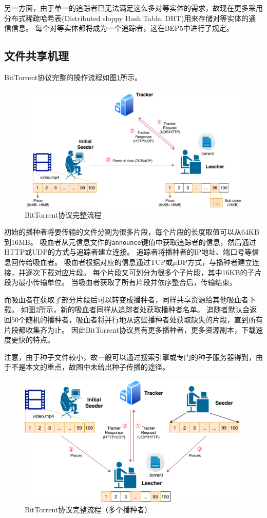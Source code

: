 \documentclass[thesis]{thesis}
\begin{document}
	另一方面，由于单一的追踪者已无法满足这么多对等实体的需求，故现在更多采用分布式稀疏哈希表(Distributed sloppy Hash Table, DHT)用来存储对等实体的通信信息。
	每个对等实体都将成为一个追踪者，这在BEP5\cite{bt_dht}中进行了规定。
	
	\subsection{文件共享机理}
	\label{sub:share}
	BitTorrent协议完整的操作流程如图\ref{fig:overview}所示。
	
	\begin{figure}[htbp]
		\centering
		\includegraphics[width=0.7\linewidth]{fig/BitTorrent-BitTorrent.pdf}
		\caption{BitTorrent协议完整流程}
		\label{fig:overview}
	\end{figure}
	
	初始的播种者将要传输的文件分割为很多片段，每个片段的长度取值可以从64KB到16MB。
	吸血者从元信息文件的\verb'announce'键值中获取追踪者的信息，然后通过HTTP或UDP的方式与追踪者建立连接。
	追踪者将播种者的IP地址、端口号等信息回传给吸血者。
	吸血者根据对应的信息通过TCP或$\mu$DP方式，与播种者建立连接，并逐次下载对应片段。
	每个片段又可划分为很多个子片段，其中16KB的子片段为最小传输单位。
	当吸血者获取了所有片段并依序整合后，传输结束。
	
	而吸血者在获取了部分片段后可以转变成播种者，同样共享资源给其他吸血者下载。
	如图\ref{fig:overview-2}所示，新的吸血者同样从追踪者处获取播种者名单。
	追随者默认会返回50个随机的播种者，吸血者将并行地从这些播种者处获取缺失的片段，直到所有片段都收集齐为止。
	因此BitTorrent协议具有更多播种者，更多资源副本，下载速度更快的特点。
	
	注意，由于种子文件较小，故一般可以通过搜索引擎或专门的种子服务器得到，由于不是本文的重点，故图中未给出种子传播的途径。
	\begin{figure}[htbp]
		\centering
		\includegraphics[width=0.7\linewidth]{fig/BitTorrent-BitTorrent-2.pdf}
		\caption{BitTorrent协议完整流程（多个播种者）}
		\label{fig:overview-2}
	\end{figure}
	
\end{document}
